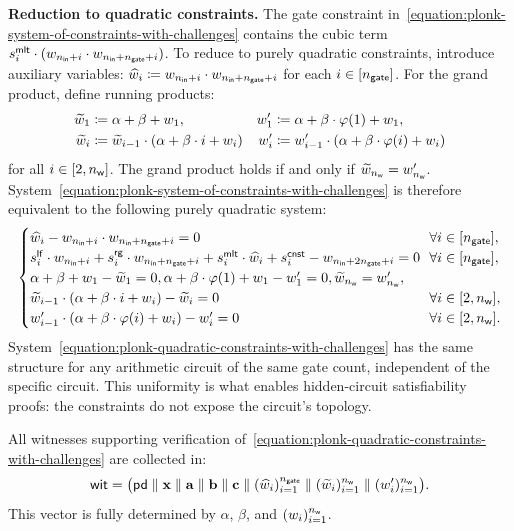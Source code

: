\medskip
\noindent\textbf{Reduction to quadratic constraints.}
The gate constraint in~\eqref{equation:plonk-system-of-constraints-with-challenges}
contains the cubic term $s_i^{\mathsf{mlt}} \cdot (w_{n_\mathsf{in} + i} \cdot w_{n_\mathsf{in} + n_\mathsf{gate} + i})$.
To reduce to purely quadratic constraints, introduce auxiliary variables:
$\widehat{w}_i \coloneqq w_{n_\mathsf{in} + i} \cdot w_{n_\mathsf{in} + n_\mathsf{gate} + i}$ for each $i \in [n_\mathsf{gate}]$.
For the grand product, define running products:
\begin{align*}
\widetilde{w}_1 &\coloneqq \alpha + \beta + w_1,
& w'_1 &\coloneqq \alpha + \beta \cdot \varphi(1) + w_1,
\\
\widetilde{w}_i &\coloneqq \widetilde{w}_{i - 1} \cdot (\alpha + \beta \cdot i + w_i)
& w'_i &\coloneqq w'_{i - 1} \cdot (\alpha + \beta \cdot \varphi(i) + w_i)
\end{align*}
for all $i \in [2, n_\mathsf{w}]$.
The grand product holds if and only if $\widetilde{w}_{n_\mathsf{w}} = w'_{n_\mathsf{w}}$.
System~\eqref{equation:plonk-system-of-constraints-with-challenges}
is therefore equivalent to the following purely quadratic system:
\begin{equation}\label{equation:plonk-quadratic-constraints-with-challenges}
\begin{cases}
\hatw_i - w_{\nin + i} \cdot w_{\nin + \ngate + i} = 0
& \!\!\forall i \in [\ngate],
\\
s_i^\sfleft \cdot w_{\nin + i}
+ s_i^\sfright \cdot w_{\nin + \ngate + i}
+ s_i^\sfmult \cdot \hatw_i
+ s_i^\sfconst - w_{\nin + 2 \ngate + i} = 0
& \!\!\forall i \in [\ngate],
\\
\alpha + \beta + w_1 - \tildew_1 = 0,
\alpha + \beta \cdot \varphi(1) + w_1 - w'_1 = 0,
\tildew_{\nw} = w'_{\nw},
\\
\tildew_{i - 1} \cdot (\alpha + \beta \cdot i + w_i) - \tildew_i = 0
& \!\!\forall i \in [2, \nw],
\\
w'_{i - 1} \cdot (\alpha + \beta \cdot \varphi(i) + w_i) - w'_i = 0
& \!\!\forall i \in [2, \nw].
\end{cases}
\end{equation}
System~\eqref{equation:plonk-quadratic-constraints-with-challenges}
has the same structure for any arithmetic circuit of the same gate count,
independent of the specific circuit.
This uniformity is what enables hidden-circuit satisfiability proofs:
the constraints do not expose the circuit's topology.

All witnesses supporting verification of~\eqref{equation:plonk-quadratic-constraints-with-challenges}
are collected in:
\begin{equation}\label{equation:plonk-ww}
\mathsf{wit} = \bigl(
\mathsf{pd} \;\|\;
\mathbf{x} \;\|\; \mathbf{a} \;\|\; \mathbf{b} \;\|\; \mathbf{c} \;\|\;
(\widehat{w}_i)_{i = 1}^{n_\mathsf{gate}} \;\|\;
(\widetilde{w}_i)_{i = 1}^{n_\mathsf{w}} \;\|\;
(w'_i)_{i = 1}^{n_\mathsf{w}}
\bigr).
\end{equation}
This vector is fully determined by $\alpha$, $\beta$, and $(w_i)_{i = 1}^{n_\mathsf{w}}$.


